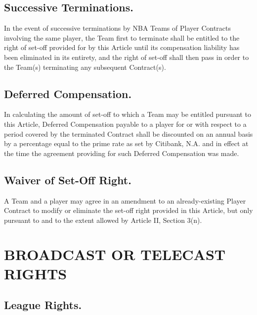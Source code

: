\documentclass[
]{book}
\begin{document}
\hypertarget{successive-terminations.}{%
\section{Successive Terminations.}\label{successive-terminations.}}

In the event of successive terminations by NBA Teams of Player Contracts involving the same player, the Team first to terminate shall be entitled to the right of set-off provided for by this Article until its compensation liability has been eliminated in its entirety, and the right of set-off shall then pass in order to the Team(s) terminating any subsequent Contract(s).

\hypertarget{deferred-compensation.}{%
\section{Deferred Compensation.}\label{deferred-compensation.}}

In calculating the amount of set-off to which a Team may be entitled pursuant to this Article, Deferred Compensation payable to a player for or with respect to a period covered by the terminated Contract shall be discounted on an annual basis by a percentage equal to the prime rate as set by Citibank, N.A. and in effect at the time the agreement providing for such Deferred Compensation was made.

\hypertarget{waiver-of-set-off-right.}{%
\section{Waiver of Set-Off Right.}\label{waiver-of-set-off-right.}}

A Team and a player may agree in an amendment to an already-existing Player Contract to modify or eliminate the set-off right provided in this Article, but only pursuant to and to the extent allowed by Article II, Section 3(n).

\hypertarget{broadcast-or-telecast-rights}{%
\chapter{BROADCAST OR TELECAST RIGHTS}\label{broadcast-or-telecast-rights}}

\hypertarget{league-rights.}{%
\section{League Rights.}\label{league-rights.}}
\end{document}
